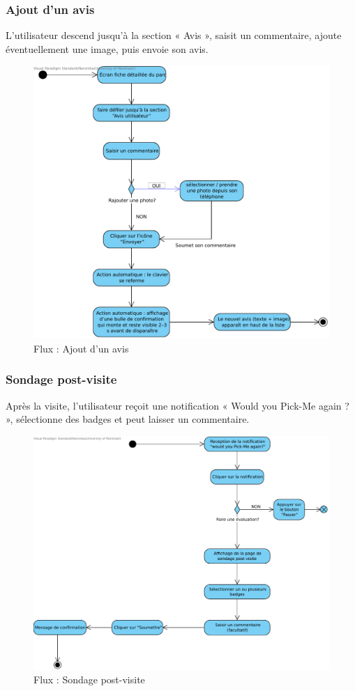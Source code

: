 \documentclass[12pt,a4paper]{article}
\begin{document}
\subsubsection{Ajout d'un avis}

L'utilisateur descend jusqu'à la section « Avis », saisit un commentaire, ajoute éventuellement une image, puis envoie son avis.

\begin{figure}[h!]
  \centering
  \includegraphics[width=0.9\linewidth]{attachments/Ajouter_un_avis_spot.pdf}
  \caption{Flux : Ajout d'un avis}
\end{figure}

\subsubsection{Sondage post-visite}

Après la visite, l'utilisateur reçoit une notification « Would you Pick-Me again ? », sélectionne des badges et peut laisser un commentaire.

\begin{figure}[h!]
  \centering
  \includegraphics[width=0.9\linewidth]{attachments/Sondage_post_visite.pdf}
  \caption{Flux : Sondage post-visite}
\end{figure}
\end{document}
